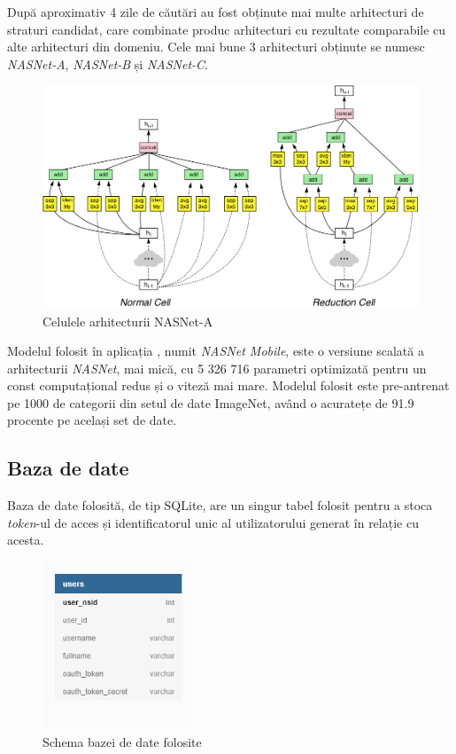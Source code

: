 După aproximativ 4 zile de căutări au fost obținute mai multe arhitecturi de straturi candidat, care combinate produc arhitecturi cu rezultate comparabile cu alte arhitecturi din domeniu. Cele mai bune 3 arhitecturi obținute se numesc \textit{NASNet-A}, \textit{NASNet-B} și \textit{NASNet-C}.

\begin{figure}[!htbp]
    \begin{center}
        \includegraphics[width=1.0\textwidth]{images/nasnetcells.png}
        \caption{Celulele arhitecturii NASNet-A \cite{DBLP:journals/corr/ZophVSL17}}
    \end{center}
\end{figure}

Modelul folosit în aplicația {\applicationtitle}, numit \textit{NASNet Mobile}, este o versiune scalată a arhitecturii \textit{NASNet}, mai mică, cu 5 326 716 parametri optimizată pentru un const computațional redus și o viteză mai mare. Modelul folosit este pre-antrenat pe 1000 de categorii din setul de date ImageNet, având o acuratețe de 91.9 procente pe același set de date.

\subsection{Baza de date}
Baza de date folosită, de tip SQLite, are un singur tabel folosit pentru a stoca \textit{token}-ul de acces și identificatorul unic al utilizatorului generat în relație cu acesta.

\begin{figure}[!htbp]
    \begin{center}
        \includegraphics[width=0.4\textwidth]{images/database.png}
        \caption{Schema bazei de date folosite}
    \end{center}
\end{figure}